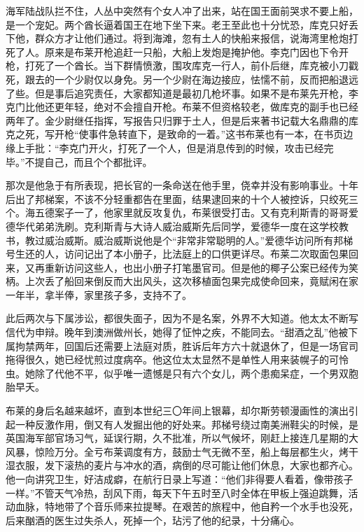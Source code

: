 \par 海军陆战队拦不住，人丛中突然有个女人冲了出来，站在国王面前哭求不要上船，是一个宠妃。两个酋长逼着国王在地下坐下来。老王至此也十分忧恐，库克只好丢下他，群众方才让他们通过。将到海滩，忽有土人的快船来报信，说海湾里枪炮打死了人。原来是布莱开枪追赶一只船，大船上发炮是掩护他。李克门因也下令开枪，打死了一个酋长。当下群情愤激，围攻库克一行人，前仆后继，库克被小刀戳死，跟去的一个少尉仅以身免。另一个少尉在海边接应，怯懦不前，反而把船退远了些。但是事后追究责任，大家都知道是最初几枪坏事。如果不是布莱先开枪，李克门比他还更年轻，绝对不会擅自开枪。布莱不但资格较老，做库克的副手也已经两年了。金少尉继任指挥，写报告只归罪于土人，但是后来著书记载大名鼎鼎的库克之死，写开枪“使事件急转直下，是致命的一着。”这书布莱也有一本，在书页边缘上手批：“李克门开火，打死了一个人，但是消息传到的时候，攻击已经完毕。”不提自己，而且个个都批评。
\par 那次是他急于有所表现，把长官的一条命送在他手里，侥幸并没有影响事业。十年后出了邦梯案，不该不分轻重都告在里面，结果逮回来的十个人被控诉，只绞死三个。海五德案子一了，他家里就反攻复仇，布莱很受打击。又有克利斯青的哥哥爱德华代弟弟洗刷。克利斯青与大诗人威治威斯先后同学，爱德华一度在这学校教书，教过威治威斯。威治威斯说他是个“非常非常聪明的人。”爱德华访问所有邦梯号生还的人，访问记出了本小册子，比法庭上的口供更详尽。布莱二次取面包果回来，又再重新访问这些人，也出小册子打笔墨官司。但是他的椰子公案已经传为笑柄。上次丢了船回来倒反而大出风头，这次移植面包果完成使命回来，竟赋闲在家一年半，拿半俸，家里孩子多，支持不了。
\par 此后两次与下属涉讼，都很失面子，因为不是名案，外界不大知道。他太太不断写信代为申辩。晚年到澳洲做州长，她得了怔忡之疾，不能同去。“甜酒之乱”他被下属拘禁两年，回国后还需要上法庭对质，胜诉后年方六十就退休了，但是一场官司拖得很久，她已经忧煎过度病卒。他这位太太显然不是单性人用来装幌子的可怜虫。她除了代他不平，似乎唯一遗憾是只有六个女儿，两个患痴呆症，一个男双胞胎早夭。
\par 布莱的身后名越来越坏，直到本世纪三〇年间上银幕，却尔斯劳顿漫画性的演出引起一种反激作用，倒又有人发掘出他的好处来。邦梯号绕过南美洲鞋尖的时候，是英国海军部官场习气，延误行期，久不批准，所以气候坏，刚赶上接连几星期的大风暴，惊险万分。全亏布莱调度有方，鼓励士气无微不至，船上每层都生火，烤干湿衣服，发下滚热的麦片与冲水的酒，病倒的尽可能让他们休息，大家也都齐心。他一向讲究卫生，好洁成癖，在航行日录上写道：“他们非得要人看着，像带孩子一样。”不管天气冷热，刮风下雨，每天下午五时至八时全体在甲板上强迫跳舞，活动血脉，特地带了个音乐师来拉提琴。在艰苦的旅程中，他自矜一个水手也没死，后来酗酒的医生过失杀人，死掉一个，玷污了他的纪录，十分痛心。
